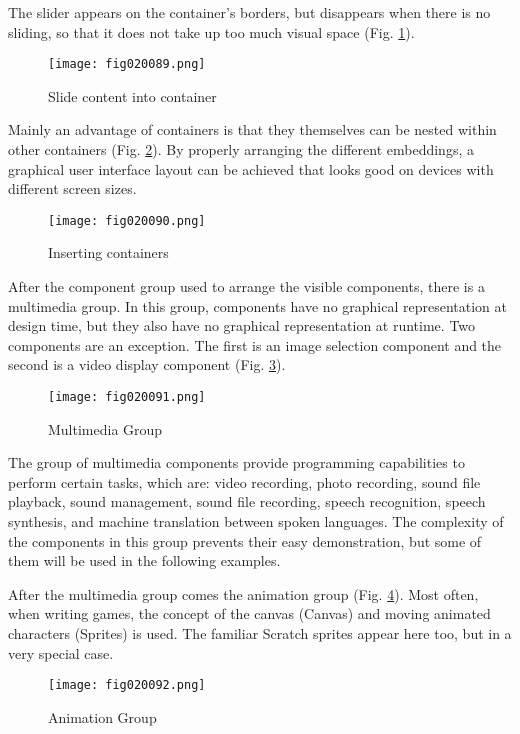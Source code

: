 The slider appears on the container's borders, but disappears when there is no sliding, so that it does not take up too much visual space (Fig. \ref{fig020089}).

\begin{figure}[H]
   \centering
   \texttt{[image: fig020089.png]}
   \caption{Slide content into container}
\label{fig020089}
\end{figure}

Mainly an advantage of containers is that they themselves can be nested within other containers (Fig. \ref{fig020090}). By properly arranging the different embeddings, a graphical user interface layout can be achieved that looks good on devices with different screen sizes.

\begin{figure}[H]
   \centering
   \texttt{[image: fig020090.png]}
   \caption{Inserting containers}
\label{fig020090}
\end{figure}

After the component group used to arrange the visible components, there is a multimedia group. In this group, components have no graphical representation at design time, but they also have no graphical representation at runtime. Two components are an exception. The first is an image selection component and the second is a video display component (Fig. \ref{fig020091}).

\begin{figure}[H]
   \centering
   \texttt{[image: fig020091.png]}
   \caption{Multimedia Group}
\label{fig020091}
\end{figure}

The group of multimedia components provide programming capabilities to perform certain tasks, which are: video recording, photo recording, sound file playback, sound management, sound file recording, speech recognition, speech synthesis, and machine translation between spoken languages. The complexity of the components in this group prevents their easy demonstration, but some of them will be used in the following examples.

After the multimedia group comes the animation group (Fig. \ref{fig020092}). Most often, when writing games, the concept of the canvas (Canvas) and moving animated characters (Sprites) is used. The familiar Scratch sprites appear here too, but in a very special case.

\begin{figure}[H]
   \centering
   \texttt{[image: fig020092.png]}
   \caption{Animation Group}
\label{fig020092}
\end{figure}

